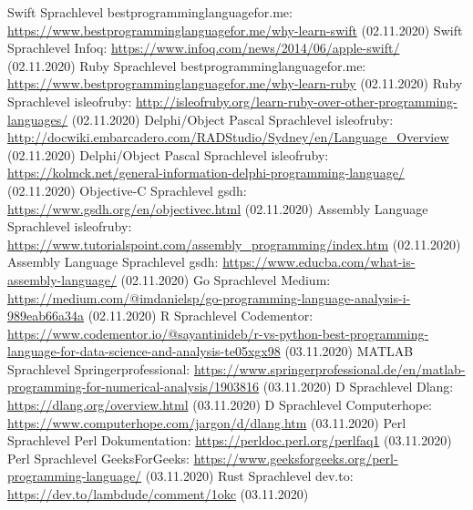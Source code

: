 \documentclass[ngerman]{article}
\begin{document}
\begin{thebibliography}{9}
        Swift Sprachlevel bestprogramminglanguagefor.me: \url{https://www.bestprogramminglanguagefor.me/why-learn-swift} (02.11.2020)
        Swift Sprachlevel Infoq: \url{https://www.infoq.com/news/2014/06/apple-swift/} (02.11.2020)
        Ruby Sprachlevel bestprogramminglanguagefor.me: \url{https://www.bestprogramminglanguagefor.me/why-learn-ruby} (02.11.2020)
        Ruby Sprachlevel isleofruby: \url{http://isleofruby.org/learn-ruby-over-other-programming-languages/} (02.11.2020)
        Delphi/Object Pascal Sprachlevel isleofruby: \url{http://docwiki.embarcadero.com/RADStudio/Sydney/en/Language_Overview} (02.11.2020)
        Delphi/Object Pascal Sprachlevel isleofruby: \url{https://kolmck.net/general-information-delphi-programming-language/} (02.11.2020)
        Objective-C Sprachlevel gsdh: \url{https://www.gsdh.org/en/objectivec.html} (02.11.2020)
        Assembly Language Sprachlevel isleofruby: \url{https://www.tutorialspoint.com/assembly_programming/index.htm} (02.11.2020)
        Assembly Language Sprachlevel gsdh: \url{https://www.educba.com/what-is-assembly-language/} (02.11.2020)
        Go Sprachlevel Medium: \url{https://medium.com/@imdanielsp/go-programming-language-analysis-i-989eab66a34a} (02.11.2020)
        R Sprachlevel Codementor: \url{https://www.codementor.io/@sayantinideb/r-vs-python-best-programming-language-for-data-science-and-analysis-te05xgx98} (03.11.2020)
        MATLAB Sprachlevel Springerprofessional: \url{https://www.springerprofessional.de/en/matlab-programming-for-numerical-analysis/1903816} (03.11.2020)
        D Sprachlevel Dlang: \url{https://dlang.org/overview.html} (03.11.2020)
        D Sprachlevel Computerhope: \url{https://www.computerhope.com/jargon/d/dlang.htm} (03.11.2020)
        Perl Sprachlevel Perl Dokumentation: \url{https://perldoc.perl.org/perlfaq1} (03.11.2020)
        Perl Sprachlevel GeeksForGeeks: \url{https://www.geeksforgeeks.org/perl-programming-language/} (03.11.2020)
        Rust Sprachlevel dev.to: \url{https://dev.to/lambdude/comment/1okc} (03.11.2020)

\end{thebibliography}
\end{document}
